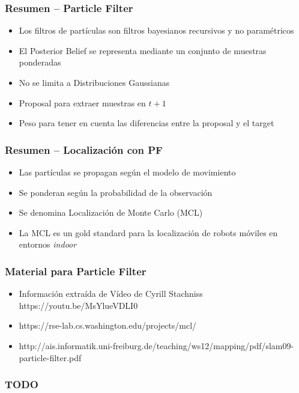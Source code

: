 \begin{frame}
    \frametitle{Resumen – Particle Filter}
    \begin{itemize}
        \item Los filtros de partículas son filtros bayesianos recursivos y no paramétricos
        \item El Posterior Belief se representa mediante un conjunto de muestras ponderadas
        \item No se limita a Distribuciones Gaussianas
        \item Proposal para extraer muestras en $t+1$
        \item Peso para tener en cuenta las diferencias entre la proposal y el target
    \end{itemize}
\end{frame}
    
\begin{frame}
    \frametitle{Resumen – Localización con PF}
    \begin{itemize}
        \item Las partículas se propagan según el modelo de movimiento
        \item Se ponderan según la probabilidad de la observación
        \item Se denomina Localización de Monte Carlo (MCL)
        \item La MCL es un gold standard para la localización de robots móviles en entornos \emph{indoor}
    \end{itemize}
\end{frame}



\begin{frame}
    \frametitle{Material para Particle Filter}
    
    \begin{itemize}
        \item Información extraída de Vídeo de Cyrill Stachniss https://youtu.be/MsYlueVDLI0
        \item https://rse-lab.cs.washington.edu/projects/mcl/
        \item http://ais.informatik.uni-freiburg.de/teaching/ws12/mapping/pdf/slam09-particle-filter.pdf
    \end{itemize}
   
\end{frame}


\begin{frame}
    \frametitle{TODO}
    
    
    
\end{frame}


    
